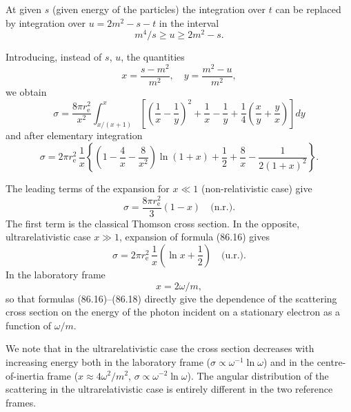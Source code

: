 At given $s$ (given energy of the particles) the integration over $t$ can be replaced by integration over $u = 2m^2 - s - t$ in the interval
\[
m^4/s \geqslant u \geqslant 2m^2 - s.
\]

Introducing, instead of $s$, $u$, the quantities
\begin{equation}
x = \frac{s - m^2}{m^2}, \quad y = \frac{m^2 - u}{m^2},
\label{eq:86.15}
\end{equation}
we obtain
\[
\sigma = \frac{8\pi r_\mathrm{e}^2}{x^2}\int_{x/(x+1)}^x \left[\left(\frac{1}{x} - \frac{1}{y}\right)^{\!2} + \frac{1}{x} - \frac{1}{y} + \frac{1}{4}\left(\frac{x}{y} + \frac{y}{x}\right)\right]dy
\]
and after elementary integration
\begin{equation}
\sigma = 2\pi r_\mathrm{e}^2\,\frac{1}{x}\left\{\left(1 - \frac{4}{x} - \frac{8}{x^2}\right)\ln(1+x) + \frac{1}{2} + \frac{8}{x} - \frac{1}{2(1+x)^2}\right\}.
\label{eq:86.16}
\end{equation}


The leading terms of the expansion for $x \ll 1$ (non-relativistic case) give
\begin{equation}
\sigma = \frac{8\pi r_\mathrm{e}^2}{3}(1 - x) \quad \text{(n.r.)}.
\label{eq:86.17}
\end{equation}
The first term is the classical Thomson cross section. In the opposite, ultrarelativistic case $x \gg 1$, expansion of formula (86.16) gives
\begin{equation}
\sigma = 2\pi r_\mathrm{e}^2\,\frac{1}{x}\left(\ln x + \frac{1}{2}\right) \quad \text{(u.r.)}.
\label{eq:86.18}
\end{equation}
In the laboratory frame
\begin{equation}
x = 2\omega/m,
\label{eq:86.19}
\end{equation}
so that formulas (86.16)--(86.18) directly give the dependence of the scattering cross section on the energy of the photon incident on a stationary electron as a function of $\omega/m$.


We note that in the ultrarelativistic case the cross section decreases with increasing energy both in the laboratory frame ($\sigma \propto \omega^{-1}\ln\omega$) and in the centre-of-inertia frame ($x \approx 4\omega^2/m^2$, $\sigma \propto \omega^{-2}\ln\omega$). The angular distribution of the scattering in the ultrarelativistic case is entirely different in the two reference frames.

